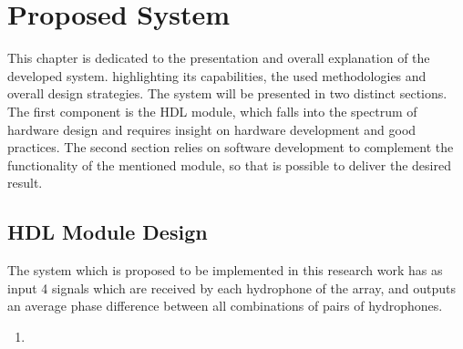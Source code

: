 \chapter{Proposed System} \label{chap:proposed_sys}

This chapter is dedicated to the presentation and overall explanation of the developed system. highlighting its capabilities, the used methodologies and overall design strategies. 
The system will be presented in two distinct sections. The first component is the HDL module, which falls into the spectrum of hardware design and requires insight on hardware development and good practices. The second section relies on software development to complement the functionality of the mentioned module, so that is possible to deliver the desired result.

\section{HDL Module Design}

The system which is proposed to be implemented in this research work has as input 4 signals which are received by each hydrophone of the array, and outputs an average phase difference between all combinations of pairs of hydrophones. 

\begin{enumerate}
	\item 
\end{enumerate}


